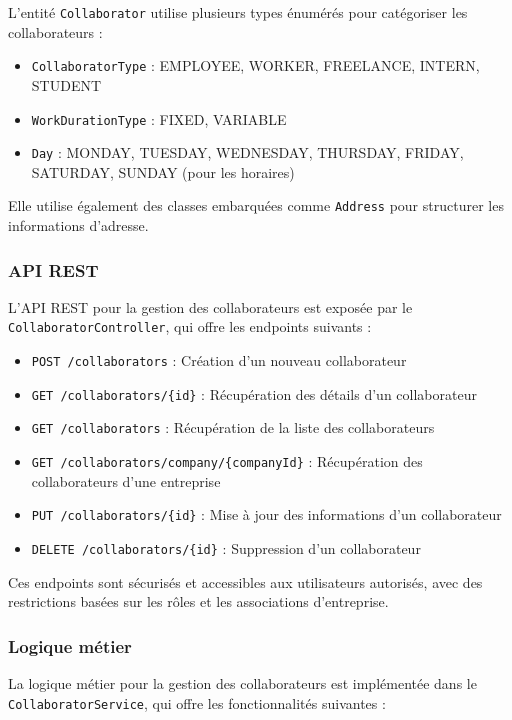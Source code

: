 \documentclass[12pt,a4paper]{report}
\begin{document}
L'entité \texttt{Collaborator} utilise plusieurs types énumérés pour catégoriser les collaborateurs :
\begin{itemize}
  \item \texttt{CollaboratorType} : EMPLOYEE, WORKER, FREELANCE, INTERN, STUDENT
  \item \texttt{WorkDurationType} : FIXED, VARIABLE
  \item \texttt{Day} : MONDAY, TUESDAY, WEDNESDAY, THURSDAY, FRIDAY, SATURDAY, SUNDAY (pour les horaires)
\end{itemize}

Elle utilise également des classes embarquées comme \texttt{Address} pour structurer les informations d'adresse.

\subsubsection{API REST}

L'API REST pour la gestion des collaborateurs est exposée par le \texttt{CollaboratorController}, qui offre les endpoints suivants :

\begin{itemize}
  \item \texttt{POST /collaborators} : Création d'un nouveau collaborateur
  \item \texttt{GET /collaborators/\{id\}} : Récupération des détails d'un collaborateur
  \item \texttt{GET /collaborators} : Récupération de la liste des collaborateurs
  \item \texttt{GET /collaborators/company/\{companyId\}} : Récupération des collaborateurs d'une entreprise
  \item \texttt{PUT /collaborators/\{id\}} : Mise à jour des informations d'un collaborateur
  \item \texttt{DELETE /collaborators/\{id\}} : Suppression d'un collaborateur
\end{itemize}

Ces endpoints sont sécurisés et accessibles aux utilisateurs autorisés, avec des restrictions basées sur les rôles et les associations d'entreprise.

\subsubsection{Logique métier}

La logique métier pour la gestion des collaborateurs est implémentée dans le \texttt{CollaboratorService}, qui offre les fonctionnalités suivantes :
\end{document}
